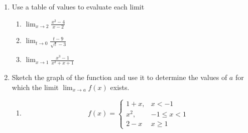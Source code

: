 \documentclass[11pt]{article}
\begin{document}
\begin{enumerate}
\begin{enumerate}
\end{enumerate}






\item Use a table of values to evaluate each limit

\begin{enumerate}

\item $\lim_{x\to 2} \frac{x^2 -4}{x - 2}$\\


\item $\lim_{t \to 0} \frac{t - 9}{\sqrt{t} - 3}$\\




\item $\lim_{x\rightarrow 1} \frac{x^3 - 1}{x^2 + x + 1}$\\





\end{enumerate}

\newpage

\item Sketch the graph of the function and use it to determine the values of $a$ for which the limit $\lim_{x\rightarrow a}f(x)$ exists.\\

\begin{enumerate}

\item \[f(x)=\begin{cases} 1+x, & x<-1 \\ x^2, & -1\leq x<1 \\ 2-x & x\geq 1 \end{cases} \]


\end{enumerate}
\end{enumerate}
\end{document}
